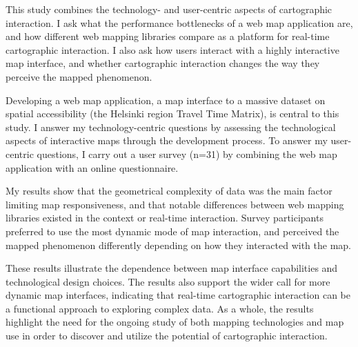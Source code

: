 \begin{spacing}{1}
This study combines the technology- and user-centric aspects of cartographic interaction.
I ask what the performance bottlenecks of a web map application are,
and how different web mapping libraries compare as a platform for real-time cartographic interaction.
I also ask how users interact with a highly interactive map interface,
and whether cartographic interaction changes the way they perceive the mapped phenomenon.

Developing a web map application,
a map interface to a massive dataset on spatial accessibility (the Helsinki region Travel Time Matrix),
is central to this study.
I answer my technology-centric questions by assessing the technological aspects of interactive maps
through the development process.
To answer my user-centric questions,
I carry out a user survey (n=31) by combining the web map application with an online questionnaire.

My results show that the geometrical complexity of data was the main factor limiting
map responsiveness, and that notable differences between web mapping libraries existed
in the context or real-time interaction.
Survey participants preferred to use the most dynamic mode of map interaction,
and perceived the mapped phenomenon differently depending on how they interacted with the map.

These results illustrate the dependence between map interface capabilities and technological design choices.
The results also support the wider call for more dynamic map interfaces,
indicating that real-time cartographic interaction can be a functional approach to exploring complex data.
As a whole, the results highlight the need for the ongoing study of both mapping technologies and map use
in order to discover and utilize the potential of cartographic interaction.

\end{spacing}
